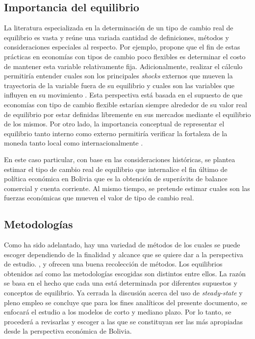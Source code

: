 \documentclass[12pt,letterpaper]{article}
\begin{document}
\subsection*{Importancia del equilibrio}
La literatura especializada en la determinación de un tipo de cambio real de equilibrio es vasta y reúne una variada cantidad de definiciones, métodos y consideraciones especiales al respecto. Por ejemplo, \cite{driver2005concepts} propone que el fin de estas prácticas en economías con tipos de cambio poco flexibles es determinar el costo de mantener esta variable relativamente fija. Adicionalmente, realizar el cálculo permitiría entender cuales son los principales \emph{shocks} externos que mueven la trayectoria de la variable fuera de su equilibrio y cuales son las variables que influyen en su movimiento \citep{macdonald2000concepts}. Esta perspectiva está basada en el supuesto de que economías con tipo de cambio flexible estarían siempre alrededor de su valor real de equilibrio por estar definidas libremente en sus mercados mediante el equilibrio de los mismos. Por otro lado, la importancia conceptual de representar el equilibrio tanto interno como externo permitiría verificar la fortaleza de la moneda tanto local como internacionalmente \citep{akrama2003real}.

En este caso particular, con base en las consideraciones históricas, se plantea estimar el tipo de cambio real de equilibrio que internalice el fin último de política económica en Bolivia que es la obtención de superávits de balance comercial y cuenta corriente. Al mismo tiempo, se pretende estimar cuales son las fuerzas económicas que mueven el valor de tipo de cambio real.

\subsection*{Metodologías}
Como ha sido adelantado, hay una variedad de métodos de los cuales se puede escoger dependiendo de la finalidad y alcance que se quiere dar a la perspectiva de estudio. \cite{driver2005concepts}, \cite{macdonald2000concepts} y \cite{akrama2003real} ofrecen una buena recolección de métodos. Los equilibrios obtenidos así como las metodologías escogidas son distintos entre ellos. La razón se basa en el hecho que cada una está determinada por diferentes supuestos y conceptos de equilibrio. Ya cerrada la discusión acerca del uso de \emph{steady-state} y pleno empleo se concluye que para los fines analíticos del presente documento, se enfocará el estudio a los modelos de corto y mediano plazo. Por lo tanto, se procederá a revisarlas y escoger a las que se constituyan ser las más apropiadas desde la perspectiva económica de Bolivia.
\end{document}
